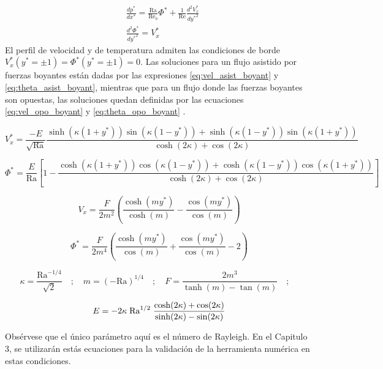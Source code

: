 \begin{align}
&\frac{d p^* }{d x^*} = \frac{\text{Ra}}{\text{Re}_b } \Phi^* + \frac{1}{\text{Re}} \frac{d^2 V^*_x}{d {y^*}^2} \\
&\frac{d^2 \Phi^*}{ d {y^*}^2 } =  V^*_x
\label{eq:base1}
\end{align}
El perfil de velocidad y de temperatura admiten las condiciones de borde $V^*_x({y^*}= \pm 1) = \Phi^* ({y^*}= \pm 1) = 0 $. Las soluciones para un flujo asistido por fuerzas boyantes están dadas por las expresiones \ref{eq:vel_asist_boyant} y \ref{eq:theta_asist_boyant}, mientras que para un flujo donde las fuerzas boyantes son opuestas, las soluciones quedan definidas por las ecuaciones \ref{eq:vel_opo_boyant} y \ref{eq:theta_opo_boyant} \cite{chen1996linear}. 
\small{
\begin{equation}
V^*_x = \frac{-E}{\sqrt{\text{Ra}}} \frac{\sinh(\kappa(1+y^*))\sin(\kappa(1-y^*)) + \sinh(\kappa(1-y^*))\sin(\kappa(1+y^*)) }{\cosh(2\kappa) + \cos(2\kappa)}
\label{eq:vel_asist_boyant}
\end{equation}

\begin{equation}
\Phi^* = \frac{E}{\text{Ra}} \left[ 1 - \frac{\cosh(\kappa(1+y^*))\cos(\kappa(1-y^*)) + \cosh(\kappa(1-y^*))\cos(\kappa(1+y^*))}{\cosh(2\kappa) + \cos(2\kappa)} \right] 
\label{eq:theta_asist_boyant}
\end{equation}


\begin{equation}
V_x = \frac{F}{2 m^2} \left( \frac{\cosh(m y^*)}{\cosh(m)} - \frac{\cos(m y^*)}{\cos(m)} \right) 
\label{eq:vel_opo_boyant}
\end{equation}

\begin{equation}
\Phi^* = \frac{F}{2 m^4} \left( \frac{\cosh(m y^*)}{\cos(m)} + \frac{\cos(m y^*)}{\cos(m)} - 2 \right) 
\label{eq:theta_opo_boyant}
\end{equation}

\begin{equation*}
\kappa = \frac{\text{Ra}^{-1/4}}{\sqrt{2}} \quad ; \quad m = (-\text{Ra})^{1/4} \quad ; \quad F = \frac{2 m^3}{\tanh(m)-\tan(m)} \quad ; \quad
\end{equation*}

\begin{equation*}
E= -2 \kappa \hspace{1mm} \text{Ra}^{1/2} \hspace{1mm} \frac{\cosh(2\kappa) + \cos(2\kappa)}{\sinh(2\kappa) - \sin(2\kappa)} 
\end{equation*}
}
Obsérvese que el único parámetro aquí es el número de Rayleigh. En el Capitulo 3, se utilizarán estás ecuaciones para la validación de la herramienta numérica en estas condiciones. 

